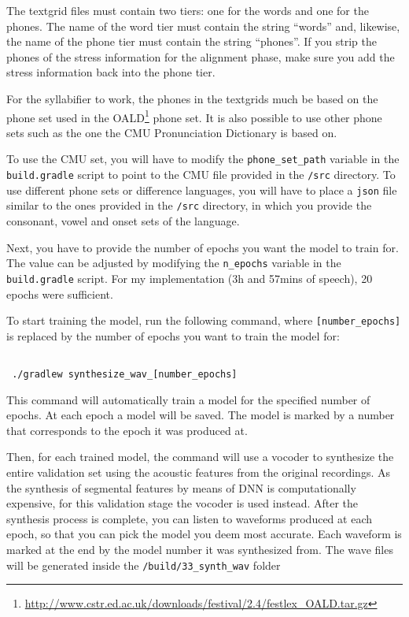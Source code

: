 The textgrid files must contain two tiers: one for the words and one for the phones.
The name of the word tier must contain the string  ``words'' and, likewise, the name of the phone tier must contain the string ``phones''.
If you strip the phones of the stress information for the alignment phase, make sure you add the stress information back into the phone tier.

For the syllabifier to work, the phones in the textgrids much be based on the phone set used in the \ac{OALD}\footnote{ \url{http://www.cstr.ed.ac.uk/downloads/festival/2.4/festlex_OALD.tar.gz}} phone set.
It is also possible to use other phone sets such as the one the \ac{CMU} Pronunciation Dictionary is based on. 

To use the \ac{CMU} set, you will have to modify the \verb|phone_set_path| variable in the \verb|build.gradle| script to point to the \ac{CMU} file provided in the \verb|/src| directory.
To use different phone sets or difference languages, you will have to place a \verb|json| file similar to the ones provided in the \verb|/src| directory, in which you provide the consonant, vowel and onset sets of the language.

Next, you have to provide the number of epochs you want the model to train for.
The value can be adjusted by modifying the \verb|n_epochs| variable in the \verb|build.gradle| script.
For my implementation (3h and 57mins of speech), 20 epochs were sufficient.

To start training the model, run the following command, where \verb|[number_epochs]| is replaced by the number of epochs you want to train the model for:

\begin{verbatim}

 ./gradlew synthesize_wav_[number_epochs]

\end{verbatim}

This command will automatically train a model for the specified number of epochs.
At each epoch a model will be saved.
The model is marked by a number that corresponds to the epoch it was produced at.

Then, for each trained model, the command will use a vocoder to synthesize the entire validation set using the acoustic features from the original recordings.
As the synthesis of segmental features by means of \ac{DNN} is computationally expensive, for this validation stage the vocoder is used instead.
After the synthesis process is complete, you can listen to waveforms produced at each epoch, so that you can pick the model you deem most accurate.
Each waveform is marked at the end by the model number it was synthesized from.
The wave files will be generated inside the \verb|/build/33_synth_wav| folder

